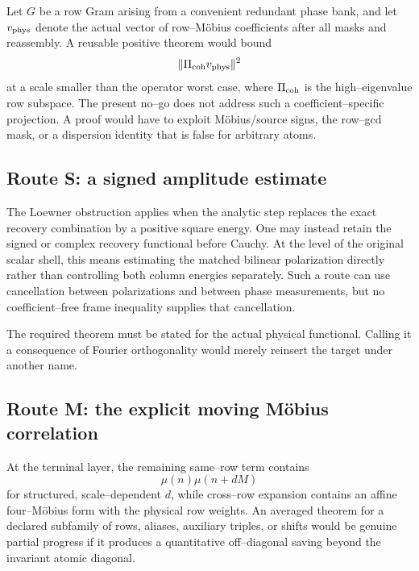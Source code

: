 Let \(G\) be a row Gram arising from a convenient redundant phase bank,
and let \(v_{\rm phys}\) denote the actual vector of row--M\"obius
coefficients after all masks and reassembly.  A reusable positive theorem
would bound
\begin{equation}
 \|\Pi_{\rm coh}v_{\rm phys}\|^2
 \label{eq:tpc40-next-coherent-projection}
\end{equation}
at a scale smaller than the operator worst case, where
\(\Pi_{\rm coh}\) is the high--eigenvalue row subspace.  The present
no--go does not address such a coefficient--specific projection.  A proof
would have to exploit M\"obius/source signs, the row--gcd mask, or a
dispersion identity that is false for arbitrary atoms.

\subsection{Route S: a signed amplitude estimate}

The Loewner obstruction applies when the analytic step replaces the exact
recovery combination by a positive square energy.  One may instead retain
the signed or complex recovery functional before Cauchy.  At the level of
the original scalar shell, this means estimating the matched bilinear
polarization directly rather than controlling both column energies
separately.  Such a route can use cancellation between polarizations and
between phase measurements, but no coefficient--free frame inequality
supplies that cancellation.

The required theorem must be stated for the actual physical functional.
Calling it a consequence of Fourier orthogonality would merely reinsert
the target under another name.

\subsection{Route M: the explicit moving M\"obius correlation}

At the terminal layer, the remaining same--row term contains
\begin{equation}
 \mu(n)\mu(n+dM)
 \label{eq:tpc40-next-two-Mobius}
\end{equation}
for structured, scale--dependent \(d\), while cross--row expansion
contains an affine four--M\"obius form with the physical row weights.
An averaged theorem for a declared subfamily of rows, aliases, auxiliary
triples, or shifts would be genuine partial progress if it produces a
quantitative off--diagonal saving beyond the invariant atomic diagonal.

